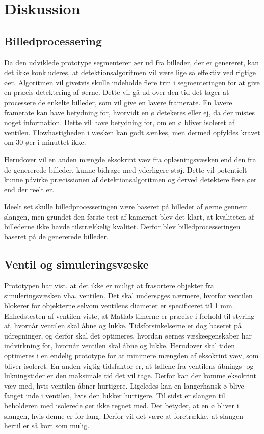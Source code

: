 \chapter{Diskussion}

\section{Billedprocessering}
Da den udviklede prototype segmenterer øer ud fra billeder, der er genereret, kan det ikke konkluderes, at detektionsalgoritmen vil være lige så effektiv ved rigtige øer. Algoritmen vil givetvis skulle indeholde flere trin i segmenteringen for at give en præcis detektering af øerne. Dette vil gå ud over den tid det tager at processere de enkelte billeder, som vil give en lavere framerate. En lavere framerate kan have betydning for, hvorvidt en ø detekeres eller ej, da der mistes noget information. Dette vil have betydning for, om en ø bliver isoleret af ventilen. Flowhastigheden i væsken kan godt sænkes, men dermed opfyldes kravet om 30 øer i minuttet ikke.

Herudover vil en anden mængde eksokrint væv fra opløsningsvæsken end den fra de genererede billeder, kunne bidrage med yderligere støj. Dette vil potentielt kunne påvirke præcissionen af detektionsalgoritmen og derved detektere flere øer end der reelt er. 

Ideelt set skulle billedprocesseringen være baseret på billeder af øerne gennem slangen, men grundet den første test af kameraet blev det klart, at kvaliteten af billederne ikke havde tilstrækkelig kvalitet. Derfor blev billedprocesseringen baseret på de genererede billeder. 

\section{Ventil og simuleringsvæske}
Prototypen har vist, at det ikke er muligt at frasortere objekter fra simuleringsvæsken vha. ventilen. Det skal undersøges nærmere, hvorfor ventilen blokerer for objekterne selvom ventilens diameter er specificeret til 1 mm. Enhedstesten af ventilen viste, at Matlab timerne er præcise i forhold til styring af, hvornår ventilen skal åbne og lukke. Tidsforsinkelserne er dog baseret på udregninger, og derfor skal det optimeres, hvordan øernes væskeegenskaber har indvirkning for, hvornår ventilen skal åbne og lukke. Herudover skal tiden optimeres i en endelig prototype for at minimere mængden af eksokrint væv, som bliver isoleret. En anden vigtig tidsfaktor er, at tallene fra ventilens åbnings- og lukningstider er den maksimale tid det vil tage. Derfor kan der komme eksokrint væv med, hvis ventilen åbner hurtigere. Ligeledes kan en langerhansk ø blive fanget inde i ventilen, hvis den lukker hurtigere. Til sidst er slangen til beholderen med isolerede øer ikke regnet med. Det betyder, at en ø bliver i slangen, hvis denne er for lang. Derfor vil det være at foretrække, at slangen hertil er så kort som mulig.



